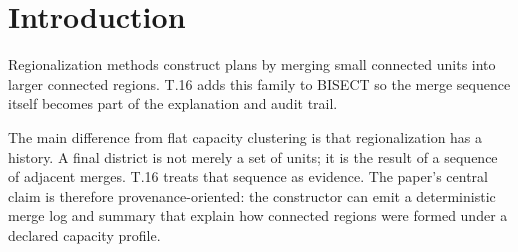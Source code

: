 \section{Introduction}

Regionalization methods construct plans by merging small connected units into
larger connected regions. T.16 adds this family to BISECT so the merge sequence
itself becomes part of the explanation and audit trail.

The main difference from flat capacity clustering is that regionalization has a
history. A final district is not merely a set of units; it is the result of a
sequence of adjacent merges. T.16 treats that sequence as evidence. The paper's
central claim is therefore provenance-oriented: the constructor can emit a
deterministic merge log and summary that explain how connected regions were
formed under a declared capacity profile.
